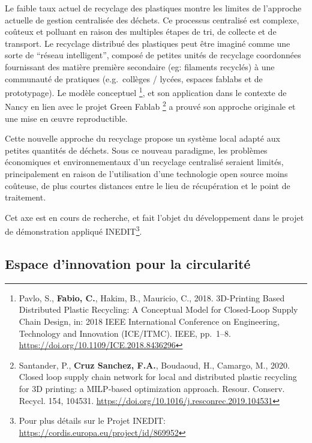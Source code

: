 \documentclass[
  12pt,
  oneside]{book}
\begin{document}
Le faible taux actuel de recyclage des plastiques montre les limites de l'approche actuelle de gestion centralisée des déchets. Ce processus centralisé est complexe, coûteux et polluant en raison des multiples étapes de tri, de collecte et de transport. Le recyclage distribué des plastiques peut être imaginé comme une sorte de ``réseau intelligent'', composé de petites unités de recyclage coordonnées fournissant des matière première secondaire (eg: filaments recyclés) à une communauté de pratiques (e.g.~collèges / lycées, espaces fablabs et de prototypage). Le modèle conceptuel \footnote{Pavlo, S., \textbf{Fabio, C.}, Hakim, B., Mauricio, C., 2018. 3D-Printing Based Distributed Plastic Recycling: A Conceptual Model for Closed-Loop Supply Chain Design, in: 2018 IEEE International Conference on Engineering, Technology and Innovation (ICE/ITMC). IEEE, pp.~1--8. \url{https://doi.org/10.1109/ICE.2018.8436296}}, et son application dans le contexte de Nancy en lien avec le projet Green Fablab \footnote{Santander, P., \textbf{Cruz Sanchez, F.A.}, Boudaoud, H., Camargo, M., 2020. Closed loop supply chain network for local and distributed plastic recycling for 3D printing: a MILP-based optimization approach. Resour. Conserv. Recycl. 154, 104531. \url{https://doi.org/10.1016/j.resconrec.2019.104531}} a prouvé son approche originale et une mise en œuvre reproductible.

Cette nouvelle approche du recyclage propose un système local adapté aux petites quantités de déchets. Sous ce nouveau paradigme, les problèmes économiques et environnementaux d'un recyclage centralisé seraient limités, principalement en raison de l'utilisation d'une technologie open source moins coûteuse, de plus courtes distances entre le lieu de récupération et le point de traitement.

Cet axe est en cours de recherche, et fait l'objet du développement dans le projet de démonstration appliqué INEDIT\footnote{Pour plus détails sur le Projet INEDIT: \url{https://cordis.europa.eu/project/id/869952}}.

\hypertarget{espace-dinnovation-pour-la-circularituxe9}{%
\subsection{Espace d'innovation pour la circularité}\label{espace-dinnovation-pour-la-circularituxe9}}
\end{document}
